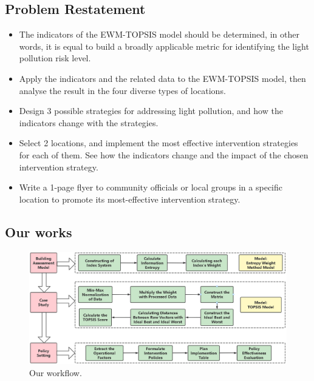 \subsection{Problem Restatement}
\begin{itemize}
    \item The indicators of the EWM-TOPSIS model should be determined, in other words, it is equal to build a broadly applicable metric for identifying the light pollution risk level.
    \item Apply the indicators and the related data to the EWM-TOPSIS model, then analyse the result in the four diverse types of locations.
    \item Design 3 possible strategies for addressing light pollution, and how the indicators change with the strategies.
    \item Select 2 locations, and implement the most effective intervention strategies for each of them. See how the indicators change and the impact of the chosen intervention strategy.
    \item Write a 1-page flyer to community officials or local groups in a specific location to promote its most-effective intervention strategy.
\end{itemize}

\subsection{Our works}
    \begin{figure}\centering
        \includegraphics[width=1\textwidth]{figures/Flowchart}
        \caption{Our workflow.} \label{fig:figure1}
    \end{figure}



